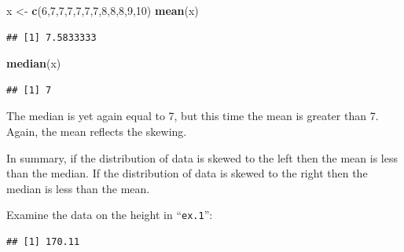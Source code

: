 \documentclass[]{krantz}
\makeatletter
\newenvironment{Shaded}{\begin{snugshade}}{\end{snugshade}}
\newcommand{\DecValTok}[1]{\textcolor[rgb]{0.00,0.00,0.81}{#1}}
\newcommand{\FloatTok}[1]{\textcolor[rgb]{0.00,0.00,0.81}{#1}}
\newcommand{\KeywordTok}[1]{\textcolor[rgb]{0.13,0.29,0.53}{\textbf{#1}}}
\newcommand{\NormalTok}[1]{#1}
\newcommand{\OperatorTok}[1]{\textcolor[rgb]{0.81,0.36,0.00}{\textbf{#1}}}
\newcommand{\StringTok}[1]{\textcolor[rgb]{0.31,0.60,0.02}{#1}}
\newenvironment{kframe}{%
\medskip{}
\setlength{\fboxsep}{.8em}
 \def\at@end@of@kframe{}%
 \ifinner\ifhmode%
  \def\at@end@of@kframe{\end{minipage}}%
  \begin{minipage}{\columnwidth}%
 \fi\fi%
 \def\FrameCommand##1{\hskip\@totalleftmargin \hskip-\fboxsep
 \colorbox{shadecolor}{##1}\hskip-\fboxsep
     \hskip-\linewidth \hskip-\@totalleftmargin \hskip\columnwidth}%
 \MakeFramed {\advance\hsize-\width
   \@totalleftmargin\z@ \linewidth\hsize
   \@setminipage}}%
 {\par\unskip\endMakeFramed%
 \at@end@of@kframe}
\renewenvironment{Shaded}{\begin{kframe}}{\end{kframe}}
\theoremstyle{definition}
\theoremstyle{definition}
\theoremstyle{definition}
\theoremstyle{remark}
\makeatother
\begin{document}
\begin{Shaded}
\begin{Highlighting}[]
\NormalTok{x <-}\StringTok{ }\KeywordTok{c}\NormalTok{(}\DecValTok{6}\NormalTok{,}\DecValTok{7}\NormalTok{,}\DecValTok{7}\NormalTok{,}\DecValTok{7}\NormalTok{,}\DecValTok{7}\NormalTok{,}\DecValTok{7}\NormalTok{,}\DecValTok{7}\NormalTok{,}\DecValTok{8}\NormalTok{,}\DecValTok{8}\NormalTok{,}\DecValTok{8}\NormalTok{,}\DecValTok{9}\NormalTok{,}\DecValTok{10}\NormalTok{)}
\KeywordTok{mean}\NormalTok{(x)}
\end{Highlighting}
\end{Shaded}

\begin{verbatim}
## [1] 7.5833333
\end{verbatim}

\begin{Shaded}
\begin{Highlighting}[]
\KeywordTok{median}\NormalTok{(x)}
\end{Highlighting}
\end{Shaded}

\begin{verbatim}
## [1] 7
\end{verbatim}

The median is yet again equal to 7, but this time the mean is greater
than 7. Again, the mean reflects the skewing.

In summary, if the distribution of data is skewed to the left then the
mean is less than the median. If the distribution of data is skewed to
the right then the median is less than the mean.

Examine the data on the height in ``\texttt{ex.1}'':

\begin{Shaded}
\end{Shaded}

\begin{verbatim}
## [1] 170.11
\end{verbatim}

\begin{Shaded}
\end{Shaded}
\end{document}
